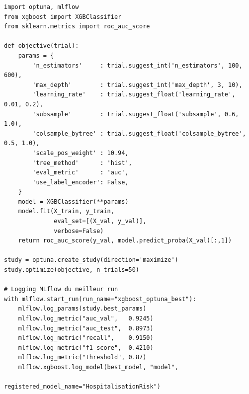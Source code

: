 \begin{lstlisting}[caption={Optimisation XGBoost avec Optuna et logging MLflow},
                   label={lst:optuna}]
import optuna, mlflow
from xgboost import XGBClassifier
from sklearn.metrics import roc_auc_score

def objective(trial):
    params = {
        'n_estimators'     : trial.suggest_int('n_estimators', 100, 600),
        'max_depth'        : trial.suggest_int('max_depth', 3, 10),
        'learning_rate'    : trial.suggest_float('learning_rate', 0.01, 0.2),
        'subsample'        : trial.suggest_float('subsample', 0.6, 1.0),
        'colsample_bytree' : trial.suggest_float('colsample_bytree', 0.5, 1.0),
        'scale_pos_weight' : 10.94,
        'tree_method'      : 'hist',
        'eval_metric'      : 'auc',
        'use_label_encoder': False,
    }
    model = XGBClassifier(**params)
    model.fit(X_train, y_train,
              eval_set=[(X_val, y_val)],
              verbose=False)
    return roc_auc_score(y_val, model.predict_proba(X_val)[:,1])

study = optuna.create_study(direction='maximize')
study.optimize(objective, n_trials=50)

# Logging MLflow du meilleur run
with mlflow.start_run(run_name="xgboost_optuna_best"):
    mlflow.log_params(study.best_params)
    mlflow.log_metric("auc_val",   0.9245)
    mlflow.log_metric("auc_test",  0.8973)
    mlflow.log_metric("recall",    0.9150)
    mlflow.log_metric("f1_score",  0.4210)
    mlflow.log_metric("threshold", 0.87)
    mlflow.xgboost.log_model(best_model, "model",
                             registered_model_name="HospitalisationRisk")
\end{lstlisting}


